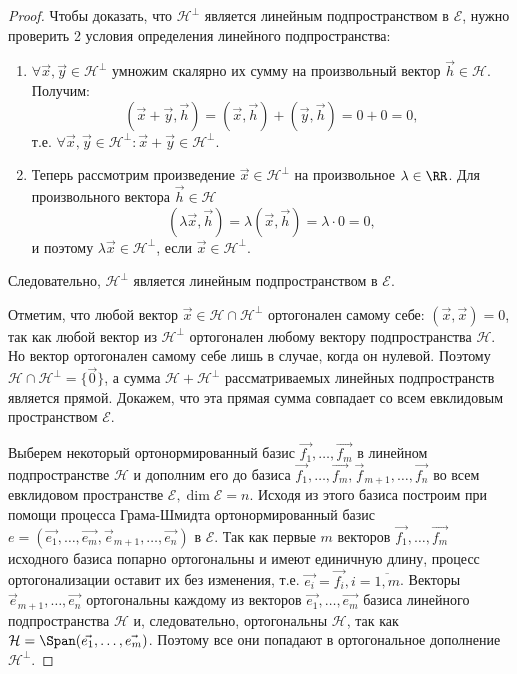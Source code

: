 \begin{proof}
    Чтобы доказать, что $\mathcal{H}^\perp$ является линейным подпространством в $\mathcal{E}$, нужно проверить 2 условия определения линейного подпространства:
    \begin{enumerate}
        \item $\forall \vec{x}, \vec{y} \in \mathcal{H}^\perp$ умножим скалярно их сумму на произвольный вектор $\vec{h} \in \mathcal{H}$. Получим:
        $$(\vec{x} + \vec{y}, \vec{h}) = (\vec{x}, \vec{h}) + (\vec{y}, \vec{h}) = 0 + 0 = 0,$$
        т.е. $\forall \vec{x}, \vec{y} \in \mathcal{H}^\perp \colon \vec{x} + \vec{y} \in \mathcal{H}^\perp$. 
        \item Теперь рассмотрим произведение $\vec{x} \in \mathcal{H}^\perp$ на произвольное $\lambda \in \RR$. Для произвольного вектора $\vec{h} \in \mathcal{H}$
        $$(\lambda \vec{x}, \vec{h}) = \lambda(\vec{x}, \vec{h}) = \lambda \cdot 0 = 0,$$
        и поэтому $\lambda \vec{x} \in \mathcal{H}^\perp$, если $\vec{x} \in \mathcal{H}^\perp$.
    \end{enumerate}
    Следовательно, $\mathcal{H}^\perp$ является линейным подпространством в $\mathcal{E}$.

    Отметим, что любой вектор $\vec{x} \in \mathcal{H} \cap \mathcal{H}^\perp$ ортогонален самому себе: $(\vec{x}, \vec{x}) = 0$, так как любой вектор из $\mathcal{H}^\perp$ ортогонален любому вектору подпространства $\mathcal{H}$. Но вектор ортогонален самому себе лишь в случае, когда он нулевой. Поэтому $\mathcal{H} \cap \mathcal{H}^\perp = \{\vec{0}\}$, а сумма $\mathcal{H} + \mathcal{H}^\perp$ рассматриваемых линейных подпространств является прямой. Докажем, что эта прямая сумма совпадает со всем евклидовым пространством $\mathcal{E}$.

    Выберем некоторый ортонормированный базис $\vec{f_1}, \ldots, \vec{f_m}$ в линейном подпространстве $\mathcal{H}$ и дополним его до базиса $\vec{f_1}, \ldots, \vec{f_m}, \vec{f}_{m + 1}, \ldots, \vec{f_n}$ во всем евклидовом пространстве $\mathcal{E}, \dim \mathcal{E} = n$. Исходя из этого базиса построим при помощи процесса Грама-Шмидта ортонормированный базис $e = (\vec{e_1}, \ldots, \vec{e_m}, \vec{e}_{m + 1}, \ldots, \vec{e_n})$ в $\mathcal{E}$. Так как первые $m$ векторов $\vec{f_1}, \ldots, \vec{f_m}$ исходного базиса попарно ортогональны и имеют единичную длину, процесс ортогонализации оставит их без изменения, т.е. $\vec{e_i} = \vec{f_i}, i = \overline{1, m}$. Векторы $\vec{e}_{m + 1}, \ldots, \vec{e_n}$ ортогональны каждому из векторов $\vec{e_1}, \ldots, \vec{e_m}$ базиса линейного подпространства $\mathcal{H}$ и, следовательно, ортогональны $\mathcal{H}$, так как $\mathcal{H} = \Span(\vec{e_1}, \ldots, \vec{e_m})$. Поэтому все они попадают в ортогональное дополнение $\mathcal{H}^\perp$.


\end{proof}
